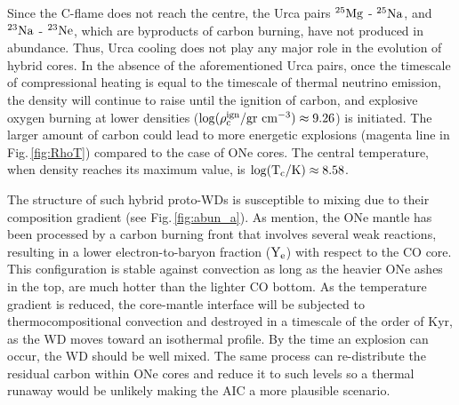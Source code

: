 \documentclass[../../main/thesis_msc.tex]{subfiles}
\begin{document}
        Since the C-flame does not reach the centre, the Urca pairs $\rm ^{25}Mg$ - $\rm ^{25}Na$, and $\rm ^{23}Na$ - $\rm ^{23}Ne$, which are byproducts of carbon burning, have not produced in abundance. Thus, Urca cooling does not play any major role in the evolution of hybrid cores. In the absence of the aforementioned Urca pairs, once the timescale of compressional heating is equal to the timescale of thermal neutrino emission, the density will continue to raise until the ignition of carbon, and explosive oxygen burning at lower densities ($\rm \log(\rho_c^{\rm ign} / \rm gr \ cm^{-3}) \approx 9.26$) is initiated. The larger amount of carbon could lead to more energetic explosions (magenta line in Fig.\,\ref{fig:RhoT}) compared to the case of ONe cores. The central temperature, when density reaches its maximum value, is $\rm \log(T_c / \rm K) \approx 8.58$.
        
        The structure of such hybrid proto-WDs is susceptible to mixing due to their composition gradient (see Fig.\,\ref{fig:abun_a}). As \cite{brooks2017} mention, the ONe mantle has been processed by a carbon burning front that involves several weak reactions, resulting in a lower electron-to-baryon fraction ($\rm Y_e$) with respect to the CO core. This configuration is stable against convection as long as the heavier ONe ashes in the top, are much hotter than the lighter CO bottom. As the temperature gradient is reduced, the core-mantle interface will be subjected to thermocompositional convection and destroyed in a timescale of the order of Kyr, as the WD moves toward an isothermal profile. By the time an explosion can occur, the WD should be well mixed. The same process can re-distribute the residual carbon within ONe cores and reduce it to such levels so a thermal runaway would be unlikely making the AIC a more plausible scenario.

    
    
\end{document}
